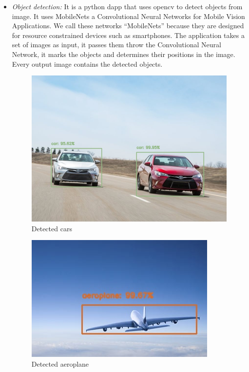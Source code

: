     \begin{itemize}
        \item \textit{Object detection: }
        It is a python dapp that uses opencv to detect objects from image. It uses
        MobileNets\cite{mobile-nets} a Convolutional Neural Networks for Mobile Vision Applications.
        We call these networks “MobileNets” because they are designed for resource constrained
        devices such as smartphones.
        The application takes a set of images as input, it passes them throw the Convolutional
        Neural Network, it marks the objects and determines their positions in the image.
        Every output image contains the detected objects.

        \clearpage

        \begin{figure}[!h]\centering
            \includegraphics[width=.6\columnwidth]{6-Implementation/figs/object-detector-exp-1.jpg}
            \caption{Detected cars}
        \end{figure}

        \vspace{50px}

        \begin{figure}[!h]\centering
            \includegraphics[width=.6\columnwidth]{6-Implementation/figs/object-detector-exp-2.jpg}
            \caption{Detected aeroplane}
        \end{figure}


\end{itemize}
